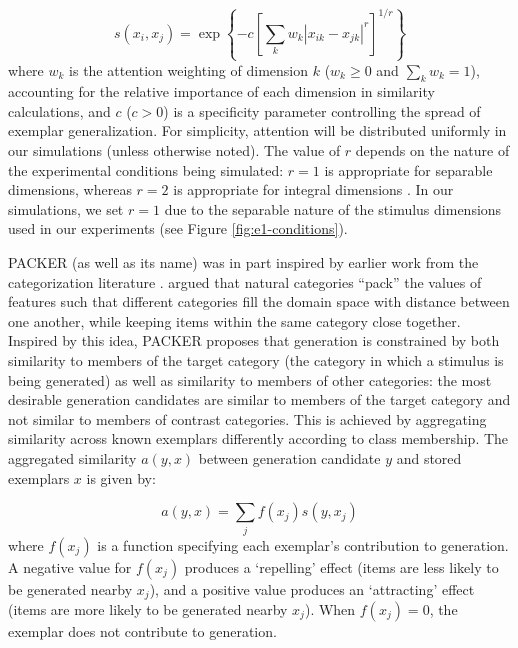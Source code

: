 \documentclass[12pt]{article}
\begin{document}
\begin{flushleft}
\begin{equation} s\left(x_i,x_j\right) = \exp \left\{ -c \left[\sum_{k}{ w_k
\left| x_{ik} - x_{jk} \right|^r }\right]^{1/r} \right\}
\label{eq:similarity}
\end{equation}
% 
where $w_k$ is the attention weighting of dimension $k$ ($w_k \geq 0$ and
$\sum_k{w_k} = 1$), accounting for the relative importance of each dimension in
similarity calculations, and $c$ ($c>0$) is a specificity parameter controlling
the spread of exemplar generalization. For simplicity, attention will be
distributed uniformly in our simulations (unless otherwise noted). The value of
$r$ depends on the nature of the experimental conditions being simulated: $r=1$
is appropriate for separable dimensions, whereas $r=2$ is appropriate for
integral dimensions \citep[e.g.,][]{shepard1964attention,garner1974processing}.
In our simulations, we set $r=1$ due to the separable nature of the stimulus
dimensions used in our experiments (see Figure \ref{fig:e1-conditions}).

PACKER (as well as its name) was in part inspired by earlier work from the
categorization literature \citep{hikada2011packing,stewart2005}. \citet{hidaka2011packing} argued that
natural categories ``pack'' the values of features such that different
categories fill the domain space with distance between one another, while
keeping items within the same category close together. Inspired by this idea,
PACKER proposes that generation is constrained by both similarity to members of
the target category (the category in which a stimulus is being generated) as
well as similarity to members of other categories: the most desirable generation
candidates are similar to members of the target category and not similar to
members of contrast categories. This is achieved by aggregating similarity
across known exemplars differently according to class membership. The aggregated
similarity $a(y,x)$ between generation candidate $y$ and stored exemplars $x$ is
given by:

\begin{equation} a(y, x) = \sum_j{f(x_j) s(y, x_j)}
\end{equation}
% 
where $f(x_j)$ is a function specifying each exemplar's contribution to
generation. A negative value for $f(x_j)$ produces a `repelling' effect (items
are less likely to be generated nearby $x_j$), and a positive value produces an
`attracting' effect (items are more likely to be generated nearby $x_j$). When
$f(x_j)=0$, the exemplar does not contribute to generation.


\end{flushleft}
\end{document}
